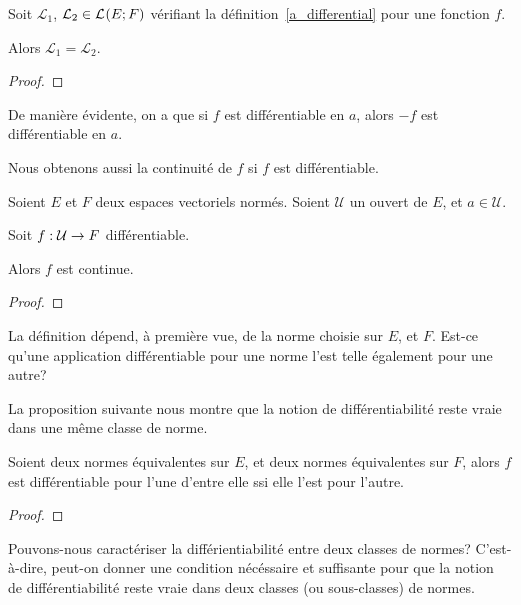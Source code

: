 \begin{proposition}
	Soit $\mathcal{L}_{1}$, $\mathcal{L}_{2} \in \mathcal{L}_{}(E; F)$
	vérifiant la définition~\ref{a_differential} pour une fonction $f$.

	Alors $\mathcal{L}_{1} = \mathcal{L}_{2}$.
\end{proposition}

\ifdefined\outputproof
\begin{proof}

\end{proof}
\fi

De manière évidente, on a que si $f$ est différentiable en $a$, alors $-f$ est
différentiable en $a$.

Nous obtenons aussi la continuité de $f$ si $f$ est différentiable.

\begin{proposition}
	Soient $E$ et $F$ deux espaces vectoriels normés.
	Soient $\mathcal{U}$ un ouvert de $E$, et $a \in \mathcal{U}$.

	Soit $f : \mathcal{U} \rightarrow F$ différentiable.

	Alors $f$ est continue.
\end{proposition}

\ifdefined\outputproof
\begin{proof}

\end{proof}
\fi

La définition dépend, à première vue, de la norme choisie sur $E$, et $F$. Est-ce
qu'une application différentiable pour une norme l'est telle également pour une
autre?

La proposition suivante nous montre que la notion de différentiabilité reste
vraie dans une même classe de norme.

\begin{proposition}
	Soient deux normes équivalentes sur $E$, et deux normes équivalentes sur
	$F$, alors $f$ est différentiable pour l'une d'entre elle ssi elle l'est
	pour l'autre.
\end{proposition}

\ifdefined\outputproof
\begin{proof}

\end{proof}
\fi

\begin{question}
	Pouvons-nous caractériser la différientiabilité entre deux classes de
	normes? C'est-à-dire, peut-on donner une condition nécéssaire et suffisante
	pour que la notion de différentiabilité reste vraie dans deux classes (ou
	sous-classes) de normes.
\end{question}

